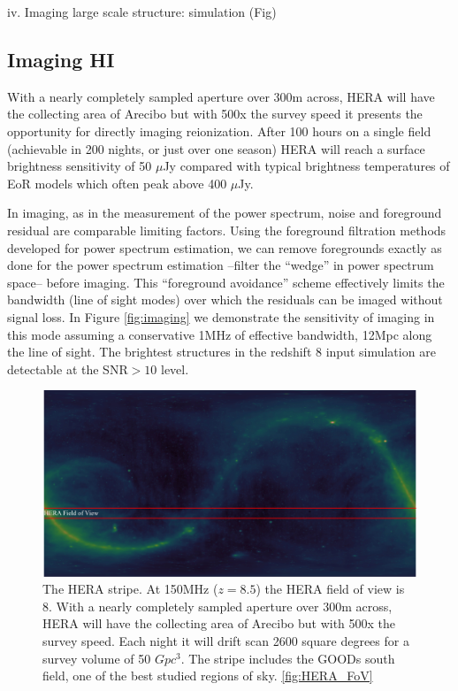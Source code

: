 \documentclass[preprint]{aastex}
\begin{document}
iv. Imaging large scale structure: simulation (Fig) 
\subsection{Imaging HI}
With a nearly completely sampled aperture over 300m across, HERA will have the collecting area of Arecibo but with 500x the survey speed it presents the opportunity for directly imaging reionization.  After 100 hours on a single field (achievable in 200 nights, or just over one season) HERA will reach a surface brightness sensitivity of 50 $\mu$Jy compared with typical brightness temperatures of EoR models which often peak above 400 $\mu$Jy.

In imaging, as in the measurement of the power spectrum, noise and foreground residual are comparable limiting factors. Using the foreground filtration methods developed for power spectrum estimation, we can remove foregrounds exactly as done for the power spectrum estimation --filter the ``wedge'' in power spectrum space-- before imaging.  This ``foreground avoidance'' scheme effectively limits the bandwidth (line of sight modes) over which the residuals can be imaged without signal loss.  In Figure \ref{fig:imaging} we demonstrate the sensitivity of imaging in this mode assuming a conservative 1MHz of effective bandwidth, 12Mpc along the line of sight.  The brightest structures in the redshift 8 input simulation are detectable at the SNR$>10$ level.

\begin{figure}[t]\centering
\includegraphics[width=\textwidth]{plots/Imaging/HERA_FoV.jpg}
\caption{The HERA stripe.  At 150MHz ($z=8.5$) the HERA field of view is 8\arcdeg.  With a nearly completely sampled aperture over 300m across, HERA will have the collecting area of Arecibo but with 500x the survey speed. Each night it will drift scan 2600 square degrees for a survey volume of 50 $Gpc^3$.  The stripe includes the GOODs south field, one of the best studied regions of sky. \ref{fig:HERA_FoV}}
\end{figure}
\end{document}

